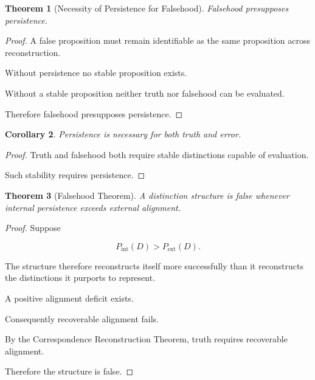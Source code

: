 \documentclass[12pt,oneside]{article}
\newtheorem{theorem}{Theorem}[section] \newtheorem{lemma}[theorem]{Lemma} \newtheorem{proposition}[theorem]{Proposition} \newtheorem{corollary}[theorem]{Corollary}
\theoremstyle{definition}
\begin{document}
\begin{theorem}[Necessity of Persistence for Falsehood]

Falsehood presupposes persistence.

\end{theorem}

\begin{proof}

A false proposition must remain identifiable as the same proposition across reconstruction.

Without persistence no stable proposition exists.

Without a stable proposition neither truth nor falsehood can be evaluated.

Therefore falsehood presupposes persistence.

\end{proof}

\begin{corollary}

Persistence is necessary for both truth and error.

\end{corollary}

\begin{proof}

Truth and falsehood both require stable distinctions capable of evaluation.

Such stability requires persistence.

\end{proof}

\begin{theorem}[Falsehood Theorem]

A distinction structure is false whenever internal persistence exceeds external alignment.

\end{theorem}

\begin{proof}

Suppose

\[
P_{\mathrm{int}}(D)
>
P_{\mathrm{ext}}(D).
\]

The structure therefore reconstructs itself more successfully than it reconstructs the distinctions it purports to represent.

A positive alignment deficit exists.

Consequently recoverable alignment fails.

By the Correspondence Reconstruction Theorem, truth requires recoverable alignment.

Therefore the structure is false.

\end{proof}
\end{document}
